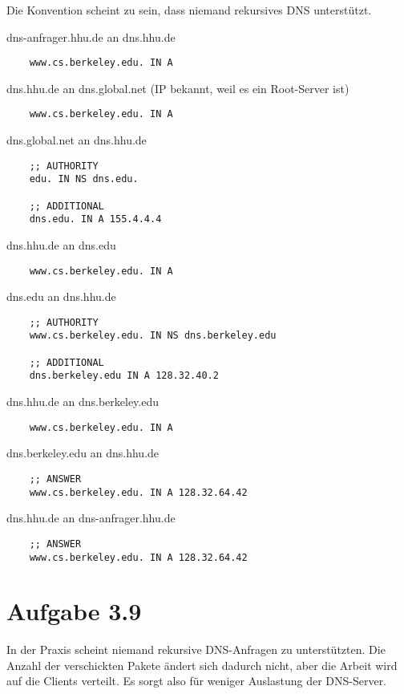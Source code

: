 \documentclass[10pt,a4paper]{article}
\begin{document}
{
  \setlength{\parindent}{0cm}

  Die Konvention scheint zu sein, dass niemand rekursives DNS unterstützt.

  dns-anfrager.hhu.de an dns.hhu.de
  \begin{lstlisting}
    www.cs.berkeley.edu. IN A
  \end{lstlisting}

  dns.hhu.de an dns.global.net (IP bekannt, weil es ein Root-Server ist)
  \begin{lstlisting}
    www.cs.berkeley.edu. IN A
  \end{lstlisting}

  dns.global.net an dns.hhu.de
  \begin{lstlisting}
    ;; AUTHORITY
    edu. IN NS dns.edu.

    ;; ADDITIONAL
    dns.edu. IN A 155.4.4.4
  \end{lstlisting}

  dns.hhu.de an dns.edu
  \begin{lstlisting}
    www.cs.berkeley.edu. IN A
  \end{lstlisting}

  dns.edu an dns.hhu.de
  \begin{lstlisting}
    ;; AUTHORITY
    www.cs.berkeley.edu. IN NS dns.berkeley.edu

    ;; ADDITIONAL
    dns.berkeley.edu IN A 128.32.40.2
  \end{lstlisting}

  dns.hhu.de an dns.berkeley.edu
  \begin{lstlisting}
    www.cs.berkeley.edu. IN A
  \end{lstlisting}

  dns.berkeley.edu an dns.hhu.de
  \begin{lstlisting}
    ;; ANSWER
    www.cs.berkeley.edu. IN A 128.32.64.42
  \end{lstlisting}

  dns.hhu.de an dns-anfrager.hhu.de
  \begin{lstlisting}
    ;; ANSWER
    www.cs.berkeley.edu. IN A 128.32.64.42
  \end{lstlisting}
}

\section{Aufgabe 3.9}

In der Praxis scheint niemand rekursive DNS-Anfragen zu unterstützten. Die
Anzahl der verschickten Pakete ändert sich dadurch nicht, aber die Arbeit wird
auf die Clients verteilt. Es sorgt also für weniger Auslastung der DNS-Server.
\end{document}
